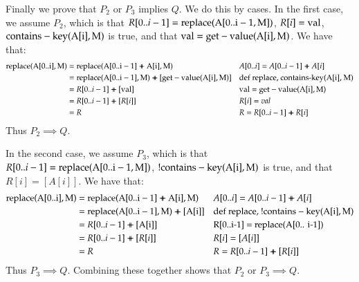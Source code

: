 \documentclass[12pt]{article}
\theoremstyle{definitionstyle}
\newcommand{\doubleplus}{\mathbin{+\mkern-10mu+}}
\begin{document}
\begin{enumerate}[leftmargin=0pt, label=(\alph*), labelindent=0pt, labelwidth=!, wide]
        Finally we prove that $P_2$ or $P_3$ implies $Q$. We do this by cases. In the first case, we assume $P_2$, which is that $R[0 .. i-1] = \rm replace(A[0 .. i-1, M])$, $R[i] = \rm val$, $\rm contains-key(A[i], M)$ is true, and that $\rm val = get-value(A[i], M)$. We have that:
        \begin{align*}
            \begin{aligned}
                \rm replace(A[0 .. i], M) &= \rm replace(A[0 .. i-1] \doubleplus A[i], M) && A[0 .. i] = A[0 .. i-1] \doubleplus A[i] \\
                &= \rm replace(A[0 .. i-1], M) \doubleplus \rm [get-value(A[i], M)] && \text{def replace, contains-key(A[i], M)} \\
                &= R[0 .. i-1] \doubleplus \rm [val] && \text{$\rm val = get-value(A[i], M)$}\\
                &= R[0 .. i-1] \doubleplus [R[i]] && \text{$R[i] = val$} \\
                &= R && \text{$R = R[0 .. i-1] \doubleplus R[i]$}
            \end{aligned}
        \end{align*}
        Thus $P_2 \implies Q$. 

        In the second case, we assume $P_3$, which is that $R[0 .. i-1] = \rm replace(A[0 .. i-1, M])$, $! \rm contains-key(A[i], M)$ is true, and that $R[i] = [A[i]]$. We have that:
        \begin{align*}
            \begin{aligned}
                \rm replace(A[0 .. i], M) &= \rm replace(A[0 .. i-1] \doubleplus A[i], M) && A[0 .. i] = A[0 .. i-1] \doubleplus A[i] \\
                &= \rm replace(A[0 .. i-1], M) \doubleplus \rm [A[i]] && \text{def replace, !$\rm contains-key(A[i], M)$} \\
                &= R[0 .. i-1] \doubleplus \rm [A[i]] && \text{R[0..i-1] = replace(A[0.. i-1])}\\
                &= R[0 .. i-1] \doubleplus [R[i]] && \text{$R[i] = [A[i]]$} \\
                &= R && \text{$R = R[0 .. i-1] \doubleplus [R[i]]$}
            \end{aligned}
        \end{align*}
        Thus $P_3 \implies Q$. Combining these together shows that $P_2$ or $P_3 \implies Q$.
    \end{enumerate}
\end{document}
